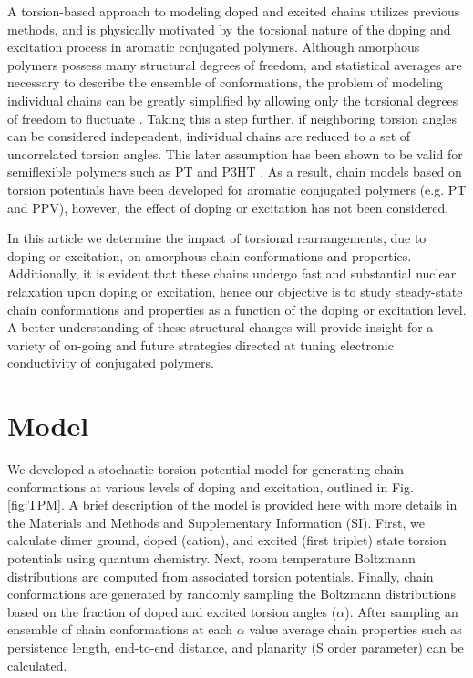 A torsion-based approach to modeling doped and excited chains utilizes previous methods, and is physically motivated by the torsional nature of the doping and excitation process in aromatic conjugated polymers. Although amorphous polymers possess many structural degrees of freedom, and statistical averages are necessary to describe the ensemble of conformations, the problem of modeling individual chains can be greatly simplified by allowing only the torsional degrees of freedom to fluctuate \cite{Flory1989}. Taking this a step further, if neighboring torsion angles can be considered independent, individual chains are reduced to a set of uncorrelated torsion angles. This later assumption has been shown to be valid for semiflexible polymers such as PT and P3HT \cite{Westenhoff2006, Zhang2014}. As a result, chain models based on torsion potentials have been developed for aromatic conjugated polymers (e.g. PT and PPV),\cite{Zhang2014, Claudio2001} however, the effect of doping or excitation has not been considered.

In this article we determine the impact of torsional rearrangements, due to doping or excitation, on amorphous chain conformations and properties. Additionally, it is evident that these chains undergo fast and substantial nuclear relaxation upon doping or excitation,\cite{Zhou2015, Busby2011} hence our objective is to study steady-state chain conformations and properties as a function of the doping or excitation level. A better understanding of these structural changes will provide insight for a variety of on-going and future strategies directed at tuning electronic conductivity of conjugated polymers.

\section{Model}

We developed a stochastic torsion potential model for generating chain conformations at various levels of doping and excitation, outlined in Fig. \ref{fig:TPM}. A brief description of the model is provided here with more details in the Materials and Methods and Supplementary Information (SI). First, we calculate dimer ground, doped (cation), and excited (first triplet) state torsion potentials using quantum chemistry. Next, room temperature Boltzmann distributions are computed from associated torsion potentials. Finally, chain conformations are generated by randomly sampling the Boltzmann distributions based on the fraction of doped and excited torsion angles ($\alpha$). After sampling an ensemble of chain conformations at each $\alpha$ value average chain properties such as persistence length, end-to-end distance, and planarity (S order parameter) can be calculated.


